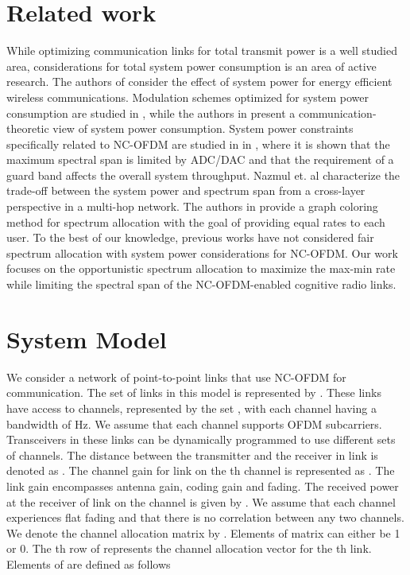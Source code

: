 \documentclass[conference]{IEEEtran}
\begin{document}
\section{Related work}
\label{sec:relwork}
While optimizing communication links for total transmit power is a well studied area, considerations for total system power consumption is an area of active research. The authors of \cite{Li11energysurvey} consider the effect of system power for energy efficient wireless communications. Modulation schemes optimized for system power consumption are studied in \cite{shug05energyopt}, while the authors in \cite{grover11syspower} present a communication-theoretic view of system power consumption. System power constraints specifically related to NC-OFDM are studied in in \cite{jia11cap, cao10dsa}, where it is shown that the maximum spectral span is limited by ADC/DAC \cite{jia11cap} and that the requirement of a guard band affects the overall system throughput. Nazmul et. al \cite{Nazmul_NCOFDM1} characterize the trade-off between the system power and spectrum span from a cross-layer perspective in a multi-hop network. The authors in \cite{zhang10grcol} provide a graph coloring method for  spectrum allocation with the goal of providing equal rates to each user. To the best of our knowledge, previous works have not considered fair spectrum allocation with system power considerations for NC-OFDM. Our work focuses on the opportunistic spectrum allocation to maximize the max-min rate while limiting the spectral span of the NC-OFDM-enabled cognitive radio links. 


\section{System Model}
\label{sec:sys}
We consider  a network of  point-to-point links  that use NC-OFDM for communication. The set of  links in this model is represented by . These links have access to  channels, represented by the  set , with each channel having a bandwidth of  Hz. We assume that each channel supports  OFDM subcarriers.  Transceivers in these links can be dynamically programmed to use different sets of channels.  The distance between the transmitter and the receiver in link  is denoted as . The channel gain  for link  on the th channel is represented as . The link gain encompasses antenna gain, coding gain and fading. The received power at the receiver of link  on the channel  is given by .  We assume that each channel experiences flat fading and that there is no correlation between any two channels. 
We denote the  channel allocation matrix by  . Elements of matrix  can either be 1 or 0. The th row of  represents the channel allocation vector for the th link. Elements of  are defined  as follows\\
\end{document}

